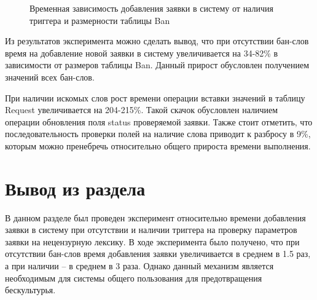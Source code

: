 \begin{figure}[H]
	\captionsetup{singlelinecheck = false, justification=centering}
	\centering
	\caption{Временная зависимость добавления заявки в систему от наличия триггера и размерности таблицы Ban}
	\label{time_graphic}
\end{figure}

Из результатов эксперимента можно сделать вывод, что при отсутствии бан-слов время на добавление новой заявки в систему увеличивается на 34-82\% в зависимости от размеров таблицы Ban. Данный прирост обусловлен получением значений всех бан-слов.

При наличии искомых слов рост времени операции вставки значений в таблицу Request увеличивается на 204-215\%. Такой скачок обусловлен наличием операции обновления поля status проверяемой заявки. Также стоит отметить, что последовательность проверки полей на наличие слова приводит к разбросу в 9\%, которым можно пренебречь относительно общего прироста времени выполнения. 

\section{Вывод из раздела}

В данном разделе был проведен эксперимент относительно времени добавления заявки в систему при отсутствии и наличии триггера на проверку параметров заявки на нецензурную лексику. В ходе эксперимента было получено, что при отсутствии бан-слов время добавления заявки увеличивается в среднем в 1.5 раз, а при наличии -- в среднем в 3 раза. Однако данный механизм является необходимым для системы общего пользования для предотвращения бескультурья. 